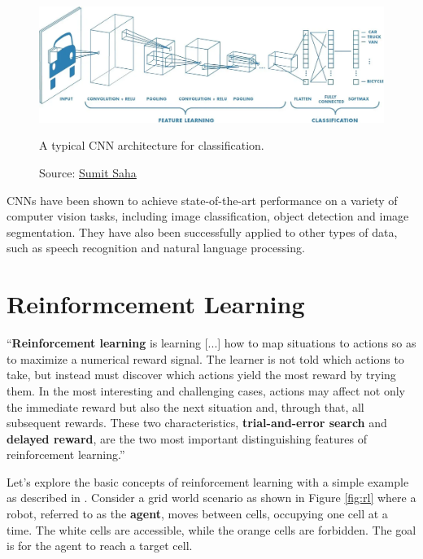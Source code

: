 \begin{figure}[h]
    \centering
    \includegraphics[width=\textwidth]{figures/ch3/8.cnn.png}
    \caption{A typical CNN architecture for classification.}
    \vspace{-10px}
    \caption*{\scriptsize{Source: \href{https://towardsdatascience.com/a-comprehensive-guide-to-convolutional-neural-networks-the-eli5-way-3bd2b1164a53}{Sumit Saha}}}
    \label{fig:cnn}
\end{figure}

CNNs have been shown to achieve state-of-the-art performance on
a variety of computer vision tasks, including image classification,
object detection and image segmentation.
They have also been successfully applied to other types of data,
such as speech recognition and natural language processing.

\section{Reinformcement Learning}
\label{sec:rl}

``\textbf{Reinforcement learning} is learning [...] how
to map situations to actions so
as to maximize a numerical reward signal.
The learner is not told which actions to
take, but instead must discover which actions
yield the most reward by trying them. In
the most interesting and challenging cases, actions may
affect not only the immediate
reward but also the next situation and,
through that, all subsequent rewards.
These two
characteristics, \textbf{trial-and-error search} and \textbf{delayed reward},
are the two most important
distinguishing features of reinforcement learning.'' \cite{sutton1998}

Let's explore the basic concepts of reinforcement learning with
a simple example as described in \cite{zhao2024RLBook}.
Consider a grid world scenario as shown in Figure \ref{fig:rl}
where a robot, referred to as
the \textbf{agent}, moves between cells, occupying one cell at a time.
The white cells are accessible, while the orange cells are forbidden.
The goal is for the agent to reach a target cell.

